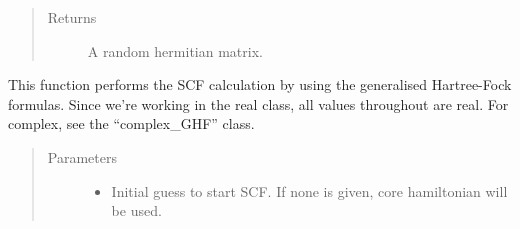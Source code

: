 \documentclass[letterpaper,10pt,english]{sphinxmanual}
\begin{document}
\begin{fulllineitems}
\begin{fulllineitems}
\begin{sphinxVerbatim}[commandchars=\\\{\}]
   
          
   
  
\end{sphinxVerbatim}
\begin{quote}\begin{description}
\item[{Returns}] \leavevmode
A random hermitian matrix.

\end{description}\end{quote}

\end{fulllineitems}


\begin{fulllineitems}
\label{\detokenize{GHF:hf.HartreeFock.GHF.MF.scf}}
This function performs the SCF calculation by using the generalised Hartree-Fock formulas. Since we’re working
in the real class, all values throughout are real. For complex, see the “complex\_GHF” class.
\begin{quote}\begin{description}
\item[{Parameters}] \leavevmode\begin{itemize}
\item {} 
 \textendash{} Initial guess to start SCF. If none is given, core hamiltonian will be used.


\end{itemize}
\end{description}
\end{quote}
\end{fulllineitems}
\end{fulllineitems}
\end{document}
